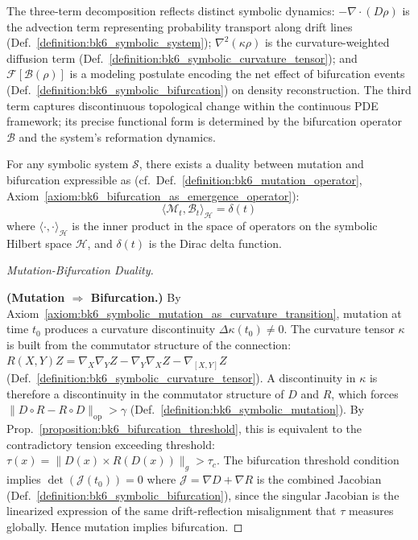\begin{remark}
The three-term decomposition reflects distinct symbolic dynamics: $-\nabla \cdot (D \rho)$ is the advection term representing probability transport along drift lines (Def.~\ref{definition:bk6_symbolic_system}); $\nabla^2(\kappa \rho)$ is the curvature-weighted diffusion term (Def.~\ref{definition:bk6_symbolic_curvature_tensor}); and $\mathcal{F}[\mathcal{B}(\rho)]$ is a modeling postulate encoding the net effect of bifurcation events (Def.~\ref{definition:bk6_symbolic_bifurcation}) on density reconstruction. The third term captures discontinuous topological change within the continuous PDE framework; its precise functional form is determined by the bifurcation operator $\mathcal{B}$ and the system's reformation dynamics.
\end{remark}
\begin{proposition}
\label{proposition:bk6_mutation_bifurcation_duality}
For any symbolic system $\mathcal{S}$, there exists a duality between mutation and bifurcation expressible as (cf.~Def.~\ref{definition:bk6_mutation_operator}, Axiom~\ref{axiom:bk6_bifurcation_as_emergence_operator}):
\begin{equation}
\langle \mathcal{M}_t, \mathcal{B}_t \rangle_{\mathcal{H}} = \delta(t)
\end{equation}
where $\langle \cdot, \cdot \rangle_{\mathcal{H}}$ is the inner product in the space of operators on the symbolic Hilbert space $\mathcal{H}$, and $\delta(t)$ is the Dirac delta function.
\begin{proof}[Mutation-Bifurcation Duality]
\label{proof:bk6_mutation_bifurcation_duality}
\leavevmode

\textbf{(Mutation $\Rightarrow$ Bifurcation.)}
By Axiom~\ref{axiom:bk6_symbolic_mutation_as_curvature_transition},
mutation at time $t_0$ produces a curvature discontinuity
$\Delta\kappa(t_0) \neq 0$.
The curvature tensor $\kappa$ is built from the commutator structure
of the connection:
$R(X,Y)Z = \nabla_X\nabla_Y Z - \nabla_Y\nabla_X Z - \nabla_{[X,Y]}Z$
(Def.~\ref{definition:bk6_symbolic_curvature_tensor}).
A discontinuity in $\kappa$ is therefore a discontinuity in the
commutator structure of $D$ and $R$, which forces
$\|D \circ R - R \circ D\|_{\mathrm{op}} > \gamma$
(Def.~\ref{definition:bk6_symbolic_mutation}).
By Prop.~\ref{proposition:bk6_bifurcation_threshold}, this is
equivalent to the contradictory tension exceeding threshold:
$\tau(x) = \|D(x) \times R(D(x))\|_g > \tau_c$.
The bifurcation threshold condition implies
$\det(\mathcal{J}(t_0)) = 0$ where
$\mathcal{J} = \nabla D + \nabla R$ is the combined Jacobian
(Def.~\ref{definition:bk6_symbolic_bifurcation}), since the
singular Jacobian is the linearized expression of the same
drift-reflection misalignment that $\tau$ measures globally.
Hence mutation implies bifurcation.


\end{proof}
\end{proposition}

